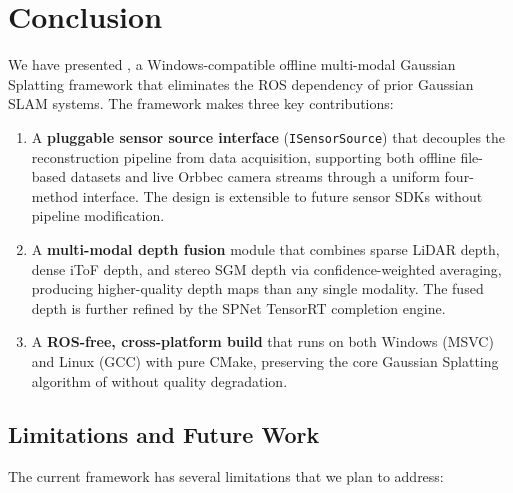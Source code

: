 \section{Conclusion}
\label{sec:conclusion}

We have presented \winlic, a Windows-compatible offline multi-modal
Gaussian Splatting framework that eliminates the ROS dependency of prior
Gaussian SLAM systems. The framework makes three key contributions:

\begin{enumerate}
    \item A \textbf{pluggable sensor source interface} (\texttt{ISensorSource})
    that decouples the reconstruction pipeline from data acquisition,
    supporting both offline file-based datasets and live Orbbec camera
    streams through a uniform four-method interface. The design is
    extensible to future sensor SDKs without pipeline modification.

    \item A \textbf{multi-modal depth fusion} module that combines sparse
    LiDAR depth, dense iToF depth, and stereo SGM depth via
    confidence-weighted averaging, producing higher-quality depth maps
    than any single modality. The fused depth is further refined by the
    SPNet TensorRT completion engine.

    \item A \textbf{ROS-free, cross-platform build} that runs on both
    Windows (MSVC) and Linux (GCC) with pure CMake, preserving the core
    Gaussian Splatting algorithm of \gaussianlic{} without quality
    degradation.
\end{enumerate}

\subsection{Limitations and Future Work}

The current framework has several limitations that we plan to address:

